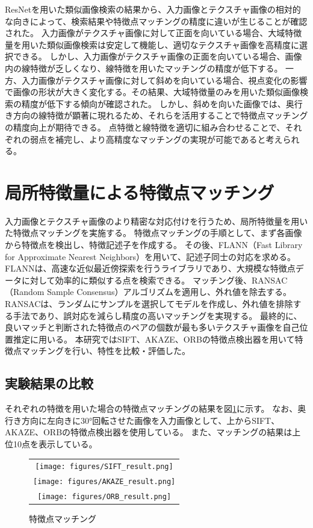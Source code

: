 \documentclass[]{jarticle}          %
\begin{document}
ResNetを用いた類似画像検索の結果から、入力画像とテクスチャ画像の相対的な向きによって、検索結果や特徴点マッチングの精度に違いが生じることが確認された。
入力画像がテクスチャ画像に対して正面を向いている場合、大域特徴量を用いた類似画像検索は安定して機能し、適切なテクスチャ画像を高精度に選択できる。
しかし、入力画像がテクスチャ画像の正面を向いている場合、画像内の線特徴が乏しくなり、線特徴を用いたマッチングの精度が低下する。
一方、入力画像がテクスチャ画像に対して斜めを向いている場合、視点変化の影響で画像の形状が大きく変化する。その結果、大域特徴量のみを用いた類似画像検索の精度が低下する傾向が確認された。
しかし、斜めを向いた画像では、奥行き方向の線特徴が顕著に現れるため、それらを活用することで特徴点マッチングの精度向上が期待できる。
点特徴と線特徴を適切に組み合わせることで、それぞれの弱点を補完し、より高精度なマッチングの実現が可能であると考えられる。

\section{局所特徴量による特徴点マッチング}
入力画像とテクスチャ画像のより精密な対応付けを行うため、局所特徴量を用いた特徴点マッチングを実施する。
特徴点マッチングの手順として、まず各画像から特徴点を検出し、特徴記述子を作成する。
その後、FLANN（Fast Library for Approximate Nearest Neighbors）を用いて、記述子同士の対応を求める。
FLANNは、高速な近似最近傍探索を行うライブラリであり、大規模な特徴点データに対して効率的に類似する点を検索できる。
マッチング後、RANSAC（Random Sample Consensus）アルゴリズムを適用し、外れ値を除去する。
RANSACは、ランダムにサンプルを選択してモデルを作成し、外れ値を排除する手法であり、誤対応を減らし精度の高いマッチングを実現する。
最終的に、良いマッチと判断された特徴点のペアの個数が最も多いテクスチャ画像を自己位置推定に用いる。
本研究ではSIFT、AKAZE、ORBの特徴点検出器を用いて特徴点マッチングを行い、特性を比較・評価した。

\subsection{実験結果の比較}
それぞれの特徴を用いた場合の特徴点マッチングの結果を図\ref{two}に示す。
なお、奥行き方向に左向きに30°回転させた画像を入力画像として、上からSIFT、AKAZE、ORBの特徴点検出器を使用している。
また、マッチングの結果は上位10点を表示している。
\begin{figure}[H]
  \begin{center}
    \begin{tabular}{c}
      \texttt{[image: figures/SIFT\_result.png]}\\
      \texttt{[image: figures/AKAZE\_result.png]}\\
      \texttt{[image: figures/ORB\_result.png]}\\
    \end{tabular}
  \end{center}
  \caption{特徴点マッチング}
  \label{two}
\end{figure}
\end{document}
